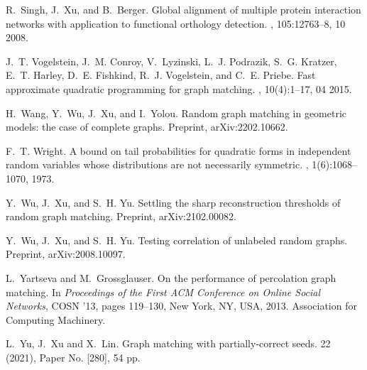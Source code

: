 \documentclass[11pt]{article}
\numberwithin{equation}{section}
\begin{document}
\begin{thebibliography}{10}
R.~Singh, J.~Xu, and B.~Berger.
\newblock Global alignment of multiple protein interaction networks with application to functional orthology detection.
, 105:12763--8, 10 2008.

J.~T. Vogelstein, J.~M. Conroy, V.~Lyzinski, L.~J. Podrazik, S.~G. Kratzer,
  E.~T. Harley, D.~E. Fishkind, R.~J. Vogelstein, and C.~E. Priebe.
\newblock Fast approximate quadratic programming for graph matching.
, 10(4):1--17, 04 2015.

H.~Wang, Y.~Wu, J.~Xu, and I.~Yolou.
\newblock Random graph matching in geometric models: the case of complete
  graphs.
\newblock Preprint, arXiv:2202.10662.

F.~T. Wright.
\newblock A bound on tail probabilities for quadratic forms in independent
  random variables whose distributions are not necessarily symmetric.
, 1(6):1068--1070, 1973.

Y.~Wu, J.~Xu, and S.~H. Yu.
\newblock Settling the sharp reconstruction thresholds of random graph
  matching.
\newblock Preprint, arXiv:2102.00082.

Y.~Wu, J.~Xu, and S.~H. Yu.
\newblock Testing correlation of unlabeled random graphs.
\newblock Preprint, arXiv:2008.10097.

L.~Yartseva and M.~Grossglauser.
\newblock On the performance of percolation graph matching.
\newblock In {\em Proceedings of the First ACM Conference on Online Social Networks}, COSN '13, pages 119--130, New York, NY, USA, 2013. Association for Computing Machinery.

L.~Yu, J.~Xu and X.~Lin.
\newblock Graph matching with partially-correct seeds. 
 22 (2021), Paper No. [280], 54 pp.

\end{thebibliography}
\end{document}
